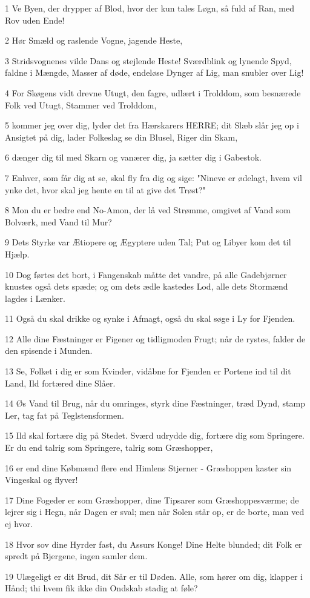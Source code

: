 \par 1 Ve Byen, der drypper af Blod, hvor der kun tales Løgn, så fuld af Ran, med Rov uden Ende!
\par 2 Hør Smæld og raslende Vogne, jagende Heste,
\par 3 Stridsvognenes vilde Dans og stejlende Heste! Sværdblink og lynende Spyd, faldne i Mængde, Masser af døde, endeløse Dynger af Lig, man snubler over Lig!
\par 4 For Skøgens vidt drevne Utugt, den fagre, udlært i Trolddom, som besnærede Folk ved Utugt, Stammer ved Trolddom,
\par 5 kommer jeg over dig, lyder det fra Hærskarers HERRE; dit Slæb slår jeg op i Ansigtet på dig, lader Folkeslag se din Blusel, Riger din Skam,
\par 6 dænger dig til med Skarn og vanærer dig, ja sætter dig i Gabestok.
\par 7 Enhver, som får dig at se, skal fly fra dig og sige: "Nineve er ødelagt, hvem vil ynke det, hvor skal jeg hente en til at give det Trøst?"
\par 8 Mon du er bedre end No-Amon, der lå ved Strømme, omgivet af Vand som Bolværk, med Vand til Mur?
\par 9 Dets Styrke var Ætiopere og Ægyptere uden Tal; Put og Libyer kom det til Hjælp.
\par 10 Dog førtes det bort, i Fangenskab måtte det vandre, på alle Gadebjørner knustes også dets spæde; og om dets ædle kastedes Lod, alle dets Stormænd lagdes i Lænker.
\par 11 Også du skal drikke og synke i Afmagt, også du skal søge i Ly for Fjenden.
\par 12 Alle dine Fæstninger er Figener og tidligmoden Frugt; når de rystes, falder de den spisende i Munden.
\par 13 Se, Folket i dig er som Kvinder, vidåbne for Fjenden er Portene ind til dit Land, Ild fortæred dine Slåer.
\par 14 Øs Vand til Brug, når du omringes, styrk dine Fæstninger, træd Dynd, stamp Ler, tag fat på Teglstensformen.
\par 15 Ild skal fortære dig på Stedet. Sværd udrydde dig, fortære dig som Springere. Er du end talrig som Springere, talrig som Græshopper,
\par 16 er end dine Købmænd flere end Himlens Stjerner - Græshoppen kaster sin Vingeskal og flyver!
\par 17 Dine Fogeder er som Græshopper, dine Tipsarer som Græshoppesværme; de lejrer sig i Hegn, når Dagen er sval; men når Solen står op, er de borte, man ved ej hvor.
\par 18 Hvor sov dine Hyrder fast, du Assurs Konge! Dine Helte blunded; dit Folk er spredt på Bjergene, ingen samler dem.
\par 19 Ulægeligt er dit Brud, dit Sår er til Døden. Alle, som hører om dig, klapper i Hånd; thi hvem fik ikke din Ondskab stadig at føle?


